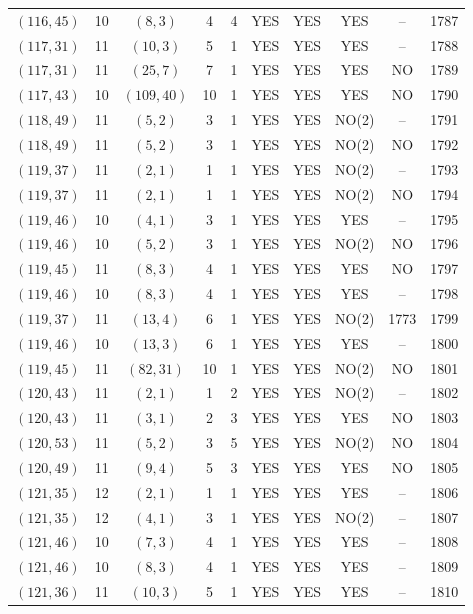 \begin{longtable}{|c|c|c|c|c|c|c|c|c|c|}
$(116, 45)$ & 10 & $(8, 3)$ & 4 & 4 & YES & YES & YES & -- & 1787\\
$(117, 31)$ & 11 & $(10, 3)$ & 5 & 1 & YES & YES & YES & -- & 1788\\
$(117, 31)$ & 11 & $(25, 7)$ & 7 & 1 & YES & YES & YES & NO & 1789\\
$(117, 43)$ & 10 & $(109, 40)$ & 10 & 1 & YES & YES & YES & NO & 1790\\
$(118, 49)$ & 11 & $(5, 2)$ & 3 & 1 & YES & YES & NO(2) & -- & 1791\\
$(118, 49)$ & 11 & $(5, 2)$ & 3 & 1 & YES & YES & NO(2) & NO & 1792\\
$(119, 37)$ & 11 & $(2, 1)$ & 1 & 1 & YES & YES & NO(2) & -- & 1793\\
$(119, 37)$ & 11 & $(2, 1)$ & 1 & 1 & YES & YES & NO(2) & NO & 1794\\
$(119, 46)$ & 10 & $(4, 1)$ & 3 & 1 & YES & YES & YES & -- & 1795\\
$(119, 46)$ & 10 & $(5, 2)$ & 3 & 1 & YES & YES & NO(2) & NO & 1796\\
$(119, 45)$ & 11 & $(8, 3)$ & 4 & 1 & YES & YES & YES & NO & 1797\\
$(119, 46)$ & 10 & $(8, 3)$ & 4 & 1 & YES & YES & YES & -- & 1798\\
$(119, 37)$ & 11 & $(13, 4)$ & 6 & 1 & YES & YES & NO(2) & 1773 & 1799\\
$(119, 46)$ & 10 & $(13, 3)$ & 6 & 1 & YES & YES & YES & -- & 1800\\
$(119, 45)$ & 11 & $(82, 31)$ & 10 & 1 & YES & YES & NO(2) & NO & 1801\\
$(120, 43)$ & 11 & $(2, 1)$ & 1 & 2 & YES & YES & NO(2) & -- & 1802\\
$(120, 43)$ & 11 & $(3, 1)$ & 2 & 3 & YES & YES & YES & NO & 1803\\
$(120, 53)$ & 11 & $(5, 2)$ & 3 & 5 & YES & YES & NO(2) & NO & 1804\\
$(120, 49)$ & 11 & $(9, 4)$ & 5 & 3 & YES & YES & YES & NO & 1805\\
$(121, 35)$ & 12 & $(2, 1)$ & 1 & 1 & YES & YES & YES & -- & 1806\\
$(121, 35)$ & 12 & $(4, 1)$ & 3 & 1 & YES & YES & NO(2) & -- & 1807\\
$(121, 46)$ & 10 & $(7, 3)$ & 4 & 1 & YES & YES & YES & -- & 1808\\
$(121, 46)$ & 10 & $(8, 3)$ & 4 & 1 & YES & YES & YES & -- & 1809\\
$(121, 36)$ & 11 & $(10, 3)$ & 5 & 1 & YES & YES & YES & -- & 1810\\

\end{longtable}
